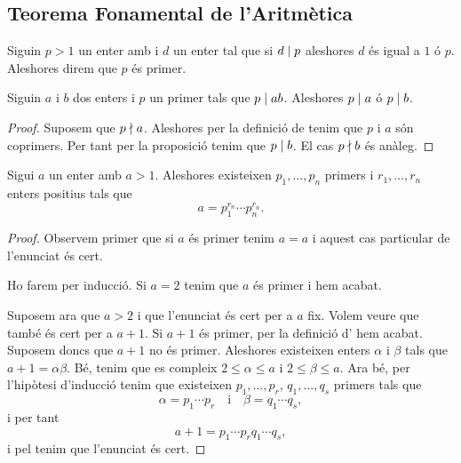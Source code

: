 \documentclass[../../Main.tex]{subfiles}
\begin{document}
	\subsection{Teorema Fonamental de l'Aritmètica}
	\begin{definition}
		\label{def:enter primer}
		Siguin \(p>1\) un enter amb i \(d\) un enter tal que si \(d\mathrel{|} p\) aleshores \(d\) és igual a \(1\) ó \(p\). Aleshores direm que \(p\) és primer.
	\end{definition}
	\begin{proposition}
		\label{prop:Si un primer divideix al producte aleshores divideix els elements}
		Siguin \(a\) i \(b\) dos enters i \(p\) un primer tals que \(p\mathrel{|} ab\). Aleshores \(p\mathrel{|} a\) ó \(p\mathrel{|} b\).
		\begin{proof}
			Suposem que \(p\mathrel{\nmid} a\). Aleshores per la definició de  tenim que \(p\) i \(a\) són coprimers. Per tant per la proposició  tenim que \(p\mathrel{|} b\). El cas \(p\mathrel{\nmid} b\) és anàleg.
		\end{proof}
	\end{proposition}
	\begin{lemma}
		\label{lema:thm:Teorema Fonamental de l'Aritmètica 1}
		Sigui \(a\) un enter amb \(a>1\). Aleshores existeixen \(p_{1},\dots,p_{n}\) primers i \(r_{1},\dots,r_{n}\) enters positius tals que
		\[a=p_{1}^{r_{n}}\cdots p_{n}^{r_{n}}.\]
		\begin{proof}
			Observem primer que si \(a\) és primer tenim \(a=a\) i aquest cas particular de l'enunciat és cert.
			
			Ho farem per inducció. Si \(a=2\) tenim que \(a\) és primer i hem acabat.
			
			Suposem ara que \(a>2\) i que l'enunciat és cert per a \(a\) fix. Volem veure que també és cert per a \(a+1\). Si \(a+1\) és primer, per la definició d' hem acabat. Suposem doncs que \(a+1\) no és primer. Aleshores existeixen enters \(\alpha\) i \(\beta\) tals que \(a+1=\alpha\beta\). Bé, tenim que es compleix \(2\leq\alpha\leq a\) i \(2\leq\beta\leq a\). Ara bé, per l'hipòtesi d'inducció tenim que existeixen \(p_{1},\dots,p_{r}\), \(q_{1},\dots,q_{s}\) primers tals que
			\[\alpha=p_{1}\cdots p_{r}\quad\text{i}\quad\beta=q_{1}\cdots q_{s},\]
			i per tant
			\[a+1=p_{1}\cdots p_{r}q_{1}\cdots q_{s},\]
			i pel  tenim que l'enunciat és cert.
		\end{proof}
	\end{lemma}
\end{document}
